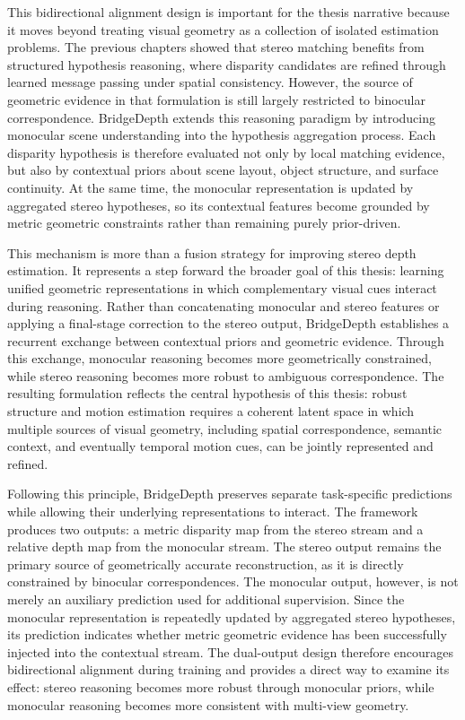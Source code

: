 This bidirectional alignment design is important for the thesis narrative because it moves beyond treating visual geometry as a collection of isolated estimation problems.
The previous chapters showed that stereo matching benefits from structured hypothesis reasoning, where disparity candidates are refined through learned message passing under spatial consistency.
However, the source of geometric evidence in that formulation is still largely restricted to binocular correspondence.
BridgeDepth extends this reasoning paradigm by introducing monocular scene understanding into the hypothesis aggregation process.
Each disparity hypothesis is therefore evaluated not only by local matching evidence, but also by contextual priors about scene layout, object structure, and surface continuity.
At the same time, the monocular representation is updated by aggregated stereo hypotheses, so its contextual features become grounded by metric geometric constraints rather than remaining purely prior-driven.

This mechanism is more than a fusion strategy for improving stereo depth estimation.
It represents a step forward the broader goal of this thesis: learning unified geometric representations in which complementary visual cues interact during reasoning.
Rather than concatenating monocular and stereo features or applying a final-stage correction to the stereo output, BridgeDepth establishes a recurrent exchange between contextual priors and geometric evidence.
Through this exchange, monocular reasoning becomes more geometrically constrained, while stereo reasoning becomes more robust to ambiguous correspondence.
The resulting formulation reflects the central hypothesis of this thesis: robust structure and motion estimation requires a coherent latent space in which multiple sources of visual geometry, including spatial correspondence, semantic context, and eventually temporal motion cues, can be jointly represented and refined.

Following this principle, BridgeDepth preserves separate task-specific predictions while allowing their underlying representations to interact.
The framework produces two outputs: a metric disparity map from the stereo stream and a relative depth map from the monocular stream.
The stereo output remains the primary source of geometrically accurate reconstruction, as it is directly constrained by binocular correspondences.
The monocular output, however, is not merely an auxiliary prediction used for additional supervision.
Since the monocular representation is repeatedly updated by aggregated stereo hypotheses, its prediction indicates whether metric geometric evidence has been successfully injected into the contextual stream.
The dual-output design therefore encourages bidirectional alignment during training and provides a direct way to examine its effect: stereo reasoning becomes more robust through monocular priors, while monocular reasoning becomes more consistent with multi-view geometry.

